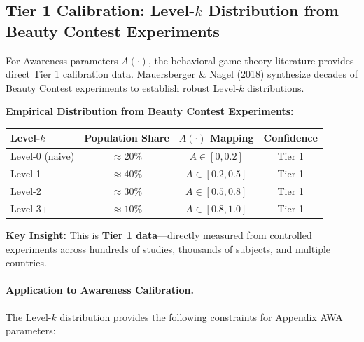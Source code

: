
\subsection{Tier 1 Calibration: Level-$k$ Distribution from Beauty Contest Experiments}
\label{sec:BBB-level-k}

For Awareness parameters $A(\cdot)$, the behavioral game theory literature provides
direct Tier 1 calibration data. Mauersberger \& Nagel (2018) synthesize decades of
Beauty Contest experiments to establish robust Level-$k$ distributions.

\begin{tcolorbox}[colback=green!5!white, colframe=green!75!black,
    title=\textbf{Tier 1 Source: Level-$k$ Distribution (Mauersberger \& Nagel 2018)}]

\textbf{Empirical Distribution from Beauty Contest Experiments:}

\begin{center}
\renewcommand{\arraystretch}{1.3}
\begin{tabular}{@{}lccc@{}}
\toprule
\textbf{Level-$k$} & \textbf{Population Share} & \textbf{$A(\cdot)$ Mapping} & \textbf{Confidence} \\
\midrule
Level-0 (naive) & $\approx 20\%$ & $A \in [0, 0.2]$ & Tier 1 \\
Level-1 & $\approx 40\%$ & $A \in [0.2, 0.5]$ & Tier 1 \\
Level-2 & $\approx 30\%$ & $A \in [0.5, 0.8]$ & Tier 1 \\
Level-3+ & $\approx 10\%$ & $A \in [0.8, 1.0]$ & Tier 1 \\
\bottomrule
\end{tabular}
\end{center}

\textbf{Key Insight:} This is \textbf{Tier 1 data}---directly measured from controlled experiments
across hundreds of studies, thousands of subjects, and multiple countries.

\end{tcolorbox}

\paragraph{Application to Awareness Calibration.}
The Level-$k$ distribution provides the following constraints for Appendix AWA parameters:

